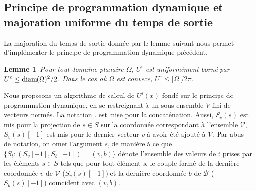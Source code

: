 \documentclass{article}
\newtheorem{lemme}{Lemme}
\begin{document}
\subsection{Principe de programmation dynamique et majoration uniforme du temps de sortie}
La majoration du temps de sortie donnée par le lemme suivant nous permet d'implémenter le principe de programmation dynamique précédent.

\begin{lemme}
	Pour tout domaine planaire $\Omega$, $U^\varepsilon$ est uniformément borné par $U^\varepsilon \leq \textup{diam}(\Omega)^2/2$. Dans le cas où $\Omega$ est convexe, $U^\varepsilon \leq |\Omega|/2\pi$.
\end{lemme}







Nous proposons un algorithme de calcul de $U^\varepsilon(x)$ fondé sur le principe de programmation dynamique, en se restreignant à un sous-ensemble $V$ fini de vecteurs normés. La notation . est mise pour la concaténation. Aussi, $S_v(s)$ est mis pour la projection de $s\in S$ sur la coordonnée correspondant à l'ensemble $\mathcal{V}$, $S_v(s)[-1]$ est mis pour le dernier vecteur $v$ à avoir été ajouté à $\mathcal{V}$. Par abus de notation, on omet l'argument $s$, de manière à ce que $\{S_t : (S_v[-1], S_b[-1])=(v,b)\}$ dénote l'ensemble des valeurs de $t$ prises par les éléments $s\in S$ tels que pour tout élément $s$, le couple formé de la dernière coordonnée $v$ de $\mathcal{V}$ ($S_v(s)[-1]$) et la dernière coordonnée $b$ de $\mathcal{B}$ ($S_b(s)[-1]$) coïncident avec $(v,b)$.
\end{document}
